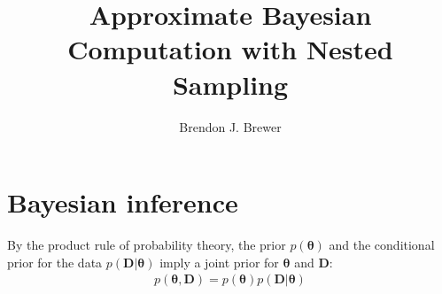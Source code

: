 \documentclass[a4paper, 11pt]{article}
\title{Approximate Bayesian Computation with Nested Sampling}
\author{Brendon J. Brewer}
\newcommand{\params}{\boldsymbol{\theta}}	%
\newcommand{\data}{\boldsymbol{D}}  %
\begin{document}
\maketitle

\section{Bayesian inference}
By the product rule of probability theory, the prior $p(\params)$ and the
conditional prior for the data $p(\data | \params)$ imply a joint prior
for $\params$ and $\data$:
\begin{equation}
\begin{array}{lr}
p(\params, \data) = p(\params)p(\data|\params)
\end{array}
\end{equation}
\end{document}
